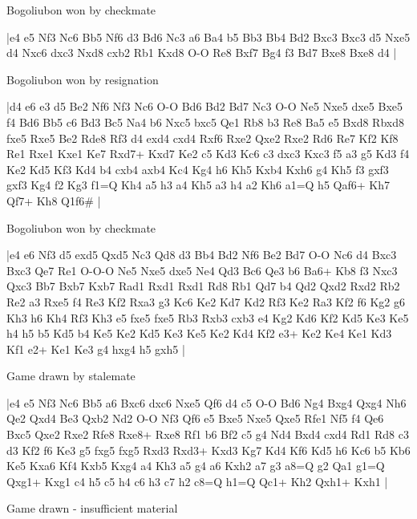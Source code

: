 \showboard

Bogoliubon won by checkmate

\makegametitle
|e4 e5 Nf3 Nc6 Bb5 Nf6 d3 Bd6 Nc3 a6 Ba4 b5 Bb3 Bb4 Bd2 Bxc3 Bxc3 d5 Nxe5 d4 Nxc6 dxc3 Nxd8 cxb2 Rb1 Kxd8 O-O Re8 Bxf7 Bg4 f3 Bd7 Bxe8 Bxe8 d4  |

\showboard

Bogoliubon won by resignation

\makegametitle
|d4 e6 e3 d5 Be2 Nf6 Nf3 Nc6 O-O Bd6 Bd2 Bd7 Nc3 O-O Ne5 Nxe5 dxe5 Bxe5 f4 Bd6 Bb5 c6 Bd3 Bc5 Na4 b6 Nxc5 bxc5 Qe1 Rb8 b3 Re8 Ba5 e5 Bxd8 Rbxd8 fxe5 Rxe5 Be2 Rde8 Rf3 d4 exd4 cxd4 Rxf6 Rxe2 Qxe2 Rxe2 Rd6 Re7 Kf2 Kf8 Re1 Rxe1 Kxe1 Ke7 Rxd7+ Kxd7 Ke2 c5 Kd3 Kc6 c3 dxc3 Kxc3 f5 a3 g5 Kd3 f4 Ke2 Kd5 Kf3 Kd4 b4 cxb4 axb4 Kc4 Kg4 h6 Kh5 Kxb4 Kxh6 g4 Kh5 f3 gxf3 gxf3 Kg4 f2 Kg3 f1=Q Kh4 a5 h3 a4 Kh5 a3 h4 a2 Kh6 a1=Q h5 Qaf6+ Kh7 Qf7+ Kh8 Q1f6\#  |

\showboard

Bogoliubon won by checkmate

\makegametitle
|e4 e6 Nf3 d5 exd5 Qxd5 Nc3 Qd8 d3 Bb4 Bd2 Nf6 Be2 Bd7 O-O Nc6 d4 Bxc3 Bxc3 Qe7 Re1 O-O-O Ne5 Nxe5 dxe5 Ne4 Qd3 Bc6 Qe3 b6 Ba6+ Kb8 f3 Nxc3 Qxc3 Bb7 Bxb7 Kxb7 Rad1 Rxd1 Rxd1 Rd8 Rb1 Qd7 b4 Qd2 Qxd2 Rxd2 Rb2 Re2 a3 Rxe5 f4 Re3 Kf2 Rxa3 g3 Kc6 Ke2 Kd7 Kd2 Rf3 Ke2 Ra3 Kf2 f6 Kg2 g6 Kh3 h6 Kh4 Rf3 Kh3 e5 fxe5 fxe5 Rb3 Rxb3 cxb3 e4 Kg2 Kd6 Kf2 Kd5 Ke3 Ke5 h4 h5 b5 Kd5 b4 Ke5 Ke2 Kd5 Ke3 Ke5 Ke2 Kd4 Kf2 e3+ Ke2 Ke4 Ke1 Kd3 Kf1 e2+ Ke1 Ke3 g4 hxg4 h5 gxh5  |

\showboard

Game drawn by stalemate

\makegametitle
|e4 e5 Nf3 Nc6 Bb5 a6 Bxc6 dxc6 Nxe5 Qf6 d4 c5 O-O Bd6 Ng4 Bxg4 Qxg4 Nh6 Qe2 Qxd4 Be3 Qxb2 Nd2 O-O Nf3 Qf6 e5 Bxe5 Nxe5 Qxe5 Rfe1 Nf5 f4 Qe6 Bxc5 Qxe2 Rxe2 Rfe8 Rxe8+ Rxe8 Rf1 b6 Bf2 c5 g4 Nd4 Bxd4 cxd4 Rd1 Rd8 c3 d3 Kf2 f6 Ke3 g5 fxg5 fxg5 Rxd3 Rxd3+ Kxd3 Kg7 Kd4 Kf6 Kd5 h6 Kc6 b5 Kb6 Ke5 Kxa6 Kf4 Kxb5 Kxg4 a4 Kh3 a5 g4 a6 Kxh2 a7 g3 a8=Q g2 Qa1 g1=Q Qxg1+ Kxg1 c4 h5 c5 h4 c6 h3 c7 h2 c8=Q h1=Q Qc1+ Kh2 Qxh1+ Kxh1  |

\showboard

Game drawn - insufficient material

